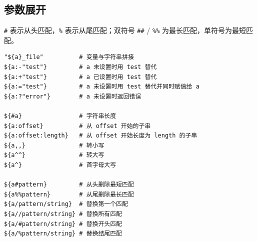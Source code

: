 \subsection{参数展开}
\texttt{\#} 表示从头匹配，\texttt{\%} 表示从尾匹配；双符号 \texttt{\#\#} / \texttt{\%\%} 为最长匹配，单符号为最短匹配。
\begin{code}[title=参数展开]
	\begin{verbatim}
"${a}_file"          # 变量与字符串拼接
${a:-"test"}         # a 未设置时用 test 替代
${a:+"test"}         # a 已设置时用 test 替代
${a:="test"}         # a 未设置时用 test 替代并同时赋值给 a
${a:?"error"}        # a 未设置时返回错误

${#a}                # 字符串长度
${a:offset}          # 从 offset 开始的子串
${a:offset:length}   # 从 offset 开始长度为 length 的子串
${a,,}               # 转小写
${a^^}               # 转大写
${a^}                # 首字母大写

${a#pattern}         # 从头删除最短匹配
${a%%pattern}        # 从尾删除最长匹配
${a/pattern/string}  # 替换第一个匹配
${a//pattern/string} # 替换所有匹配
${a/#pattern/string} # 替换开头匹配
${a/%pattern/string} # 替换结尾匹配
	\end{verbatim}
\end{code}
